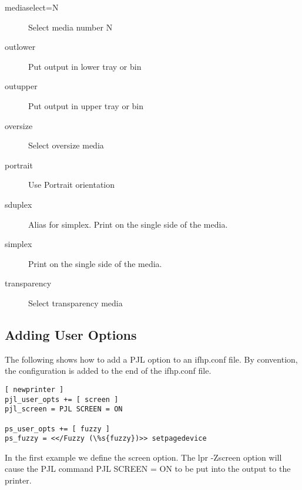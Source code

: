 \documentclass[a4paper]{article}
\begin{document}
\begin{description}
\item[mediaselect=N] \mbox{}

Select media number N

\item[outlower] \mbox{}

Put output in lower tray or bin

\item[outupper] \mbox{}

Put output in upper tray or bin

\item[oversize] \mbox{}

Select oversize media

\item[portrait] \mbox{}

Use Portrait orientation

\item[sduplex] \mbox{}

Alias for simplex.  Print on the single side of the media. 

\item[simplex] \mbox{}

Print on the single side of the media. 

\item[transparency] \mbox{}

Select transparency media

\end{description}



\subsection{Adding User Options}

The following shows how to add a PJL option to an {\ttfamily ifhp.conf}
file.
By convention,
the configuration is added to the end of the ifhp.conf file.
\begin{tscreen}
\begin{verbatim}
[ newprinter ]
pjl_user_opts += [ screen ]
pjl_screen = PJL SCREEN = ON

ps_user_opts += [ fuzzy ]
ps_fuzzy = <</Fuzzy (\%s{fuzzy})>> setpagedevice
\end{verbatim}
\end{tscreen}


In the first example we define the {\ttfamily screen} option.
The {\ttfamily lpr -Zscreen} option will cause the PJL command
{\ttfamily PJL SCREEN = ON} to be put into the output to the printer.
\end{document}
